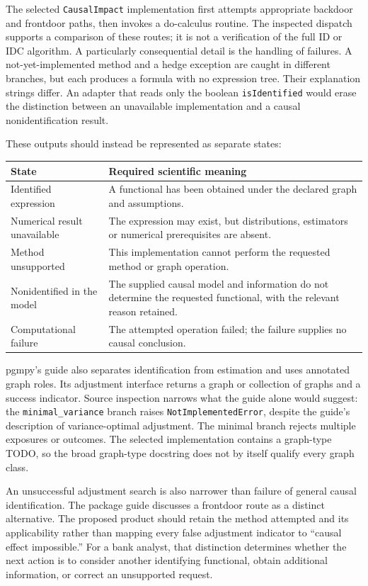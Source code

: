 The selected \texttt{CausalImpact} implementation first attempts appropriate
backdoor and frontdoor paths, then invokes a do-calculus routine. The inspected
dispatch supports a comparison of these routes; it is not a verification of
the full ID or IDC algorithm. A particularly consequential detail is the
handling of failures. A not-yet-implemented method and a hedge exception are
caught in different branches, but each produces a formula with no expression
tree. Their explanation strings differ. An adapter that reads only the boolean
\texttt{isIdentified} would erase the distinction between an unavailable
implementation and a causal nonidentification result.\cite{agrum}

These outputs should instead be represented as separate states:
\begin{center}
\begin{tabular}{p{}p{}}
\toprule
State & Required scientific meaning\\
\midrule
Identified expression & A functional has been obtained under the declared graph and assumptions.\\
Numerical result unavailable & The expression may exist, but distributions, estimators or numerical prerequisites are absent.\\
Method unsupported & This implementation cannot perform the requested method or graph operation.\\
Nonidentified in the model & The supplied causal model and information do not determine the requested functional, with the relevant reason retained.\\
Computational failure & The attempted operation failed; the failure supplies no causal conclusion.\\
\bottomrule
\end{tabular}
\end{center}

pgmpy's guide also separates identification from estimation and uses annotated
graph roles. Its adjustment interface returns a graph or collection of graphs
and a success indicator. Source inspection narrows what the guide alone would
suggest: the \texttt{minimal\_variance} branch raises
\texttt{NotImplementedError}, despite the guide's description of variance-optimal
adjustment. The minimal branch rejects multiple exposures or outcomes. The
selected implementation contains a graph-type TODO, so the broad graph-type
docstring does not by itself qualify every graph class.\cite{pgmpy}

An unsuccessful adjustment search is also narrower than failure of general
causal identification. The package guide discusses a frontdoor route as a
distinct alternative. The proposed product should retain the method attempted
and its applicability rather than mapping every false adjustment indicator to
``causal effect impossible.'' For a bank analyst, that distinction determines
whether the next action is to consider another identifying functional, obtain
additional information, or correct an unsupported request.

